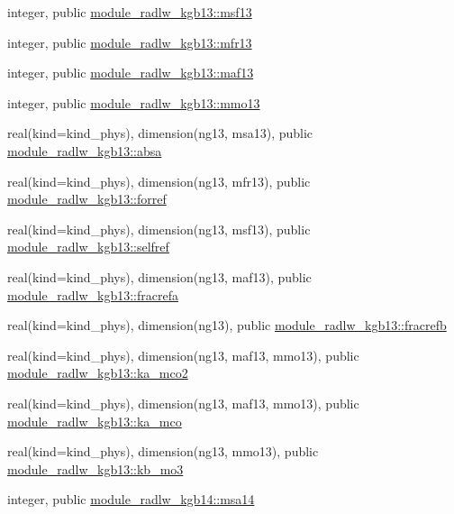 \begin{DoxyCompactItemize}
\item 
integer, public \hyperlink{namespacemodule__radlw__kgb13_a7f88590d2a9fc392b04e89fd3d4bf2bf}{module\+\_\+radlw\+\_\+kgb13\+::msf13}
\item 
integer, public \hyperlink{namespacemodule__radlw__kgb13_a158782c955af9f50aaefea2d49af97ce}{module\+\_\+radlw\+\_\+kgb13\+::mfr13}
\item 
integer, public \hyperlink{namespacemodule__radlw__kgb13_a1ddc025df872b12194b8c6344cc0204e}{module\+\_\+radlw\+\_\+kgb13\+::maf13}
\item 
integer, public \hyperlink{namespacemodule__radlw__kgb13_ae513ce55829a57a0dbda77f570e4a619}{module\+\_\+radlw\+\_\+kgb13\+::mmo13}
\item 
real(kind=kind\+\_\+phys), dimension(ng13, msa13), public \hyperlink{namespacemodule__radlw__kgb13_a22ce8d48ac3dceae1d52e80097fc2689}{module\+\_\+radlw\+\_\+kgb13\+::absa}
\item 
real(kind=kind\+\_\+phys), dimension(ng13, mfr13), public \hyperlink{namespacemodule__radlw__kgb13_a93c6546ef5f8cbfc4f63de29e1ba2452}{module\+\_\+radlw\+\_\+kgb13\+::forref}
\item 
real(kind=kind\+\_\+phys), dimension(ng13, msf13), public \hyperlink{namespacemodule__radlw__kgb13_ac8f58bba6aa4b72ffd01f78e60d0831f}{module\+\_\+radlw\+\_\+kgb13\+::selfref}
\item 
real(kind=kind\+\_\+phys), dimension(ng13, maf13), public \hyperlink{namespacemodule__radlw__kgb13_a82aed8a05cd528b287e336f7ff8fcebb}{module\+\_\+radlw\+\_\+kgb13\+::fracrefa}
\item 
real(kind=kind\+\_\+phys), dimension(ng13), public \hyperlink{namespacemodule__radlw__kgb13_a92d45aee9dab62549ea8821eae7422dd}{module\+\_\+radlw\+\_\+kgb13\+::fracrefb}
\item 
real(kind=kind\+\_\+phys), dimension(ng13, maf13, mmo13), public \hyperlink{namespacemodule__radlw__kgb13_a523a0bc861ea861869f59b7bd007ff50}{module\+\_\+radlw\+\_\+kgb13\+::ka\+\_\+mco2}
\item 
real(kind=kind\+\_\+phys), dimension(ng13, maf13, mmo13), public \hyperlink{namespacemodule__radlw__kgb13_a0c2f5802f9471c35759cb673dbc8ca05}{module\+\_\+radlw\+\_\+kgb13\+::ka\+\_\+mco}
\item 
real(kind=kind\+\_\+phys), dimension(ng13, mmo13), public \hyperlink{namespacemodule__radlw__kgb13_acc93fbdd9ce1062cbe9b01973d8ab229}{module\+\_\+radlw\+\_\+kgb13\+::kb\+\_\+mo3}
\item 
integer, public \hyperlink{namespacemodule__radlw__kgb14_a9357fbaa5663438f0c0062a45c99a8d4}{module\+\_\+radlw\+\_\+kgb14\+::msa14}

\end{DoxyCompactItemize}
